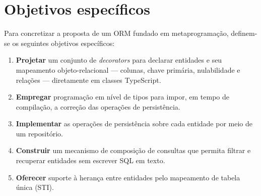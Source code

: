 \newpage
\section{Objetivos específicos}
\label{sc:objetivos}

Para concretizar a proposta de um ORM fundado em metaprogramação, definem-se os seguintes objetivos específicos:

\begin{enumerate}
    \item \textbf{Projetar} um conjunto de \emph{decorators} para declarar entidades e seu mapeamento objeto-relacional --- colunas, chave primária, nulabilidade e relações --- diretamente em classes TypeScript.
    \item \textbf{Empregar} programação em nível de tipos para impor, em tempo de compilação, a correção das operações de persistência.
    \item \textbf{Implementar} as operações de persistência sobre cada entidade por meio de um repositório.
    \item \textbf{Construir} um mecanismo de composição de consultas que permita filtrar e recuperar entidades sem escrever SQL em texto.
    \item \textbf{Oferecer} suporte à herança entre entidades pelo mapeamento de tabela única (STI).
\end{enumerate}
